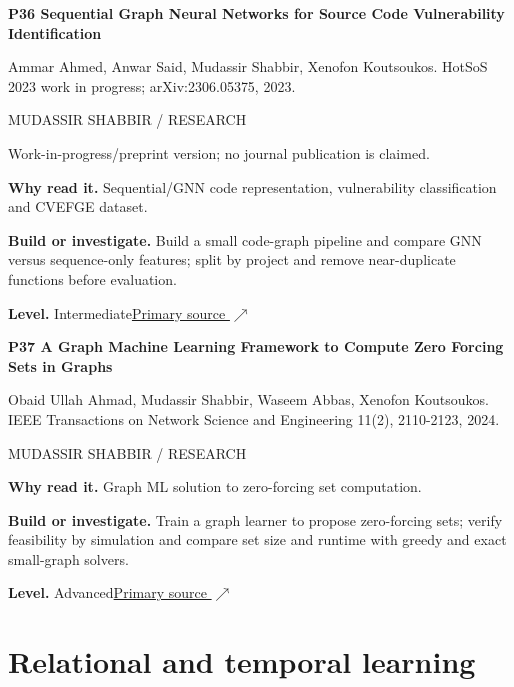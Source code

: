 \documentclass[11pt,letterpaper]{article}
\begin{document}
\begin{minipage}{\linewidth}
{\large\bfseries P36 Sequential Graph Neural Networks for Source Code Vulnerability Identification}\par
Ammar Ahmed, Anwar Said, Mudassir Shabbir, Xenofon Koutsoukos. HotSoS 2023 work in progress; arXiv:2306.05375, 2023.\par
\textcolor{ink}{\small MUDASSIR SHABBIR / RESEARCH}\par
{\small Work-in-progress/preprint version; no journal publication is claimed.}\par
\textbf{Why read it.} Sequential/GNN code representation, vulnerability classification and CVEFGE dataset.\par
\textbf{Build or investigate.} Build a small code-graph pipeline and compare GNN versus sequence-only features; split by project and remove near-duplicate functions before evaluation.\par
\textbf{Level.} Intermediate\quad\href{https://arxiv.org/abs/2306.05375}{Primary source $\nearrow$}\par
\end{minipage}\par\vspace{10pt}
\begin{minipage}{\linewidth}
{\large\bfseries P37 A Graph Machine Learning Framework to Compute Zero Forcing Sets in Graphs}\par
Obaid Ullah Ahmad, Mudassir Shabbir, Waseem Abbas, Xenofon Koutsoukos. IEEE Transactions on Network Science and Engineering 11(2), 2110-2123, 2024.\par
\textcolor{ink}{\small MUDASSIR SHABBIR / RESEARCH}\par
\textbf{Why read it.} Graph ML solution to zero-forcing set computation.\par
\textbf{Build or investigate.} Train a graph learner to propose zero-forcing sets; verify feasibility by simulation and compare set size and runtime with greedy and exact small-graph solvers.\par
\textbf{Level.} Advanced\quad\href{https://doi.org/10.1109/TNSE.2023.3337750}{Primary source $\nearrow$}\par
\end{minipage}\par\vspace{10pt}
\section*{Relational and temporal learning}
\end{document}
